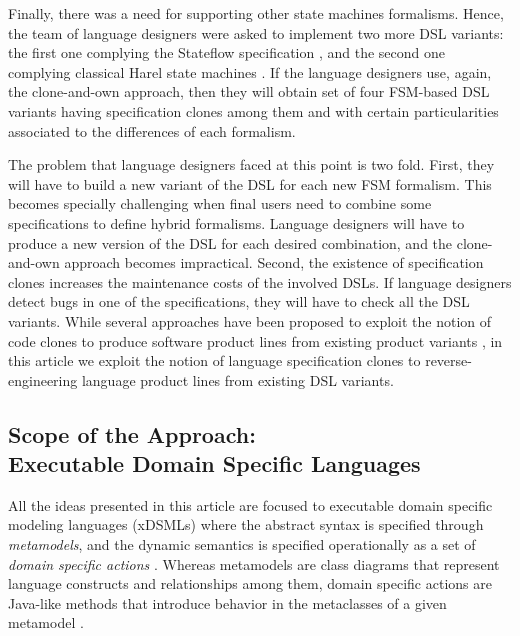 Finally, there was a need for supporting other state machines formalisms. Hence, the team of language designers were asked to implement two more DSL variants: the first one complying the Stateflow specification \cite{Martaj:2010}, and the second one complying classical Harel state machines \cite{Harel:1996}. If the language designers use, again, the clone-and-own approach, then they will obtain set of four FSM-based DSL variants having specification clones among them and with certain particularities associated to the differences of each formalism. %

The problem that language designers faced at this point is two fold. First, they will have to build a new variant of the DSL for each new FSM formalism. This becomes specially challenging when final users need to combine some specifications to define hybrid formalisms. Language designers will have to produce a new version of the DSL for each desired combination, and the clone-and-own approach becomes impractical. Second, the existence of specification clones increases the maintenance costs of the involved DSLs. If language designers detect bugs in one of the specifications, they will have to check all the DSL variants. While several approaches have been proposed to exploit the notion of code clones to produce software product lines from existing product variants \cite{LopezHerrejon:2015,Martinez:2015,Martinez:2015b}, in this article we exploit the notion of language specification clones to reverse-engineering language product lines from existing DSL variants.


\subsection{Scope of the Approach: \\ \textbf{Executable Domain Specific Languages}}
\label{sec:technologicalscope}

All the ideas presented in this article are focused to executable domain specific modeling languages (xDSMLs) where the abstract syntax is specified through \textit{metamodels}, and the dynamic semantics is specified operationally as a set of \textit{domain specific actions} \cite{Combemale:2013}. Whereas metamodels are class diagrams that represent language constructs and relationships among them, domain specific actions are Java-like methods that introduce behavior in the metaclasses of a given metamodel \cite{Jezequel:2015b}. %

